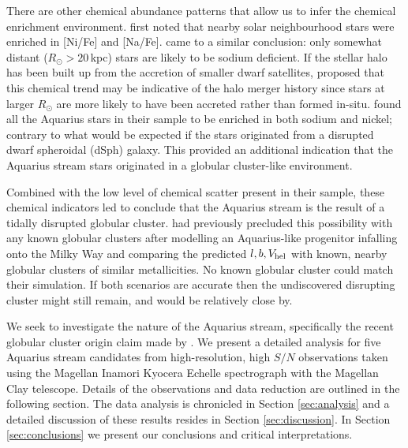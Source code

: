 \documentclass{emulateapj}
\begin{document}
There are other chemical abundance patterns that allow us to infer the chemical enrichment environment. \citet{nissen;schuster_1997} first noted that nearby solar neighbourhood stars were enriched in [Ni/Fe] and [Na/Fe]. \citet{fulbright_2000} came to a similar conclusion: only somewhat distant ($R_\odot > 20$\,kpc) stars are likely to be sodium deficient. If the stellar halo has been built up from the accretion of smaller dwarf satellites, \citet{nissen;schuster_1997} proposed that this chemical trend may be indicative of the halo merger history since stars at larger $R_\odot$ are more likely to have been accreted rather than formed in-situ. \citet{wylie-de-boer;et-al_2012} found all the Aquarius stars in their sample to be enriched in both sodium and nickel; contrary to what would be expected if the stars originated from a disrupted dwarf spheroidal (dSph) galaxy. This provided an additional indication that the Aquarius stream stars originated in a globular cluster-like environment.

Combined with the low level of chemical scatter present in their sample, these chemical indicators led \citet{wylie-de-boer;et-al_2012} to conclude that the Aquarius stream is the result of a tidally disrupted globular cluster. \citet{williams;et-al_2011} had previously precluded this possibility with any known globular clusters after modelling an Aquarius-like progenitor infalling onto the Milky Way and comparing the predicted $l, b, V_{\rm hel}$ with known, nearby globular clusters of similar metallicities. No known globular cluster could match their simulation. If both scenarios are accurate then the undiscovered disrupting cluster might still remain, and would be relatively close by.

We seek to investigate the nature of the Aquarius stream, specifically the recent globular cluster origin claim made by \citet{wylie-de-boer;et-al_2012}. We present a detailed analysis for five Aquarius stream candidates from high-resolution, high $S/N$ observations taken using the Magellan Inamori Kyocera Echelle spectrograph \citep{bernstein;et-al_2003} with the Magellan Clay telescope. Details of the observations and data reduction are outlined in the following section. The data analysis is chronicled in Section \ref{sec:analysis} and a detailed discussion of these results resides in Section \ref{sec:discussion}. In Section \ref{sec:conclusions} we present our conclusions and critical interpretations.
\end{document}
